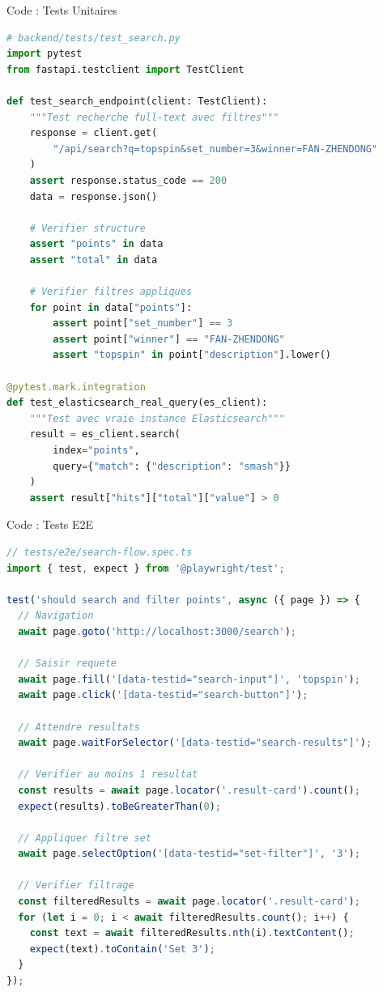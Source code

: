 \documentclass[11pt]{beamer}
\begin{document}
\begin{frame}[fragile]{Code : Tests Unitaires}
\begin{lstlisting}[language=Python, caption=Exemple de test avec Pytest]
# backend/tests/test_search.py
import pytest
from fastapi.testclient import TestClient

def test_search_endpoint(client: TestClient):
    """Test recherche full-text avec filtres"""
    response = client.get(
        "/api/search?q=topspin&set_number=3&winner=FAN-ZHENDONG"
    )
    assert response.status_code == 200
    data = response.json()
    
    # Verifier structure
    assert "points" in data
    assert "total" in data
    
    # Verifier filtres appliques
    for point in data["points"]:
        assert point["set_number"] == 3
        assert point["winner"] == "FAN-ZHENDONG"
        assert "topspin" in point["description"].lower()

@pytest.mark.integration
def test_elasticsearch_real_query(es_client):
    """Test avec vraie instance Elasticsearch"""
    result = es_client.search(
        index="points",
        query={"match": {"description": "smash"}}
    )
    assert result["hits"]["total"]["value"] > 0
\end{lstlisting}
\end{frame}

\begin{frame}[fragile]{Code : Tests E2E}
\begin{lstlisting}[language=JavaScript, caption=Test Playwright - Recherche vidéo]
// tests/e2e/search-flow.spec.ts
import { test, expect } from '@playwright/test';

test('should search and filter points', async ({ page }) => {
  // Navigation
  await page.goto('http://localhost:3000/search');
  
  // Saisir requete
  await page.fill('[data-testid="search-input"]', 'topspin');
  await page.click('[data-testid="search-button"]');
  
  // Attendre resultats
  await page.waitForSelector('[data-testid="search-results"]');
  
  // Verifier au moins 1 resultat
  const results = await page.locator('.result-card').count();
  expect(results).toBeGreaterThan(0);
  
  // Appliquer filtre set
  await page.selectOption('[data-testid="set-filter"]', '3');
  
  // Verifier filtrage
  const filteredResults = await page.locator('.result-card');
  for (let i = 0; i < await filteredResults.count(); i++) {
    const text = await filteredResults.nth(i).textContent();
    expect(text).toContain('Set 3');
  }
});
\end{lstlisting}
\end{frame}
\end{document}
